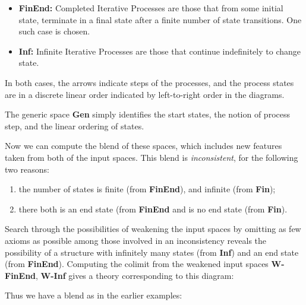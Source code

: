 
\begin{itemize}
\item  \textbf{FinEnd:} Completed Iterative Processes
are those that from some initial state, terminate in a final state
after a finite number of state transitions.  One such case is chosen.
\item 
\textbf{Inf:} Infinite Iterative Processes are those that continue indefinitely
to change state.
\end{itemize}
In both cases, the arrows indicate steps of the processes, and
the process states are in a discrete linear order indicated by left-to-right
order in the diagrams.

The generic space \textbf{Gen} simply identifies the start states, the
notion of process step, and the linear ordering of states.

Now we can compute the blend of these spaces,
which includes new features taken from both of the
input spaces.  This blend is \emph{inconsistent}, for the
following two reasons:
\begin{enumerate}
\item the number of states is finite (from \textbf{FinEnd}), and infinite
(from \textbf{Fin});
\item  there both is an end state (from \textbf{FinEnd}
and is no end state (from \textbf{Fin}).
\end{enumerate}
Search through the possibilities of weakening the input spaces by
omitting as few axioms as possible among those involved
in an inconsistency reveals the possibility of a structure
with infinitely many states (from \textbf{Inf}) and an
end state (from \textbf{FinEnd}).  Computing the
colimit from the weakened input spaces \textbf{W-FinEnd}, \textbf{W-Inf}
gives a theory corresponding to this diagram:
\begin{center}
\end{center}
Thus we have a blend as in the earlier examples:

